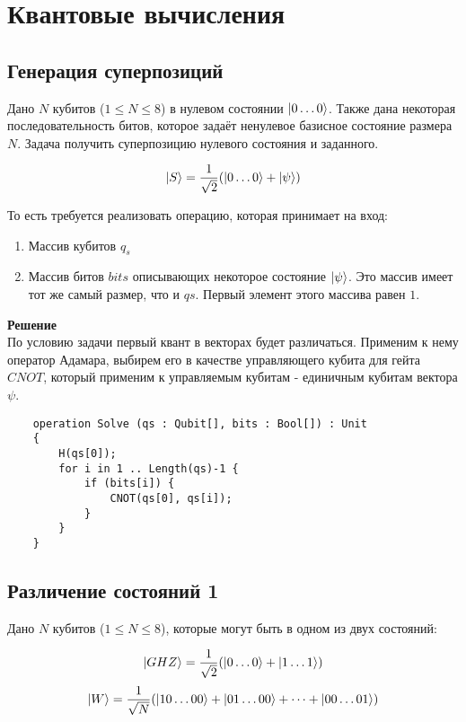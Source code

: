 \documentclass{article}
\begin{document}
\section{Квантовые вычисления}
\subsection{Генерация суперпозиций}
Дано $N$ кубитов ($1 \le N \le 8$) в нулевом состоянии $\ket{0\dots0}$. Также дана некоторая последовательность битов, которое задаёт ненулевое базисное состояние размера $N$. Задача получить суперпозицию нулевого состояния и заданного.

$$\ket{S} = \frac{1}{\sqrt2}(\ket{0\dots0} +\ket{\psi})$$

То есть требуется реализовать операцию, которая принимает на вход:

\begin{enumerate}
    \item Массив кубитов $q_s$
    \item Массив битов $bits$ описывающих некоторое состояние $\ket{\psi}$. Это массив имеет тот же самый размер, что и $qs$. Первый элемент этого массива равен $1$.
\end{enumerate}
\textbf{Решение}\\По условию задачи первый квант в векторах будет различаться. Применим к нему оператор Адамара, выбирем его в качестве управляющего кубита для гейта $CNOT$, который применим к управляемым кубитам - единичным кубитам вектора $\psi$.

\begin{verbatim}
    operation Solve (qs : Qubit[], bits : Bool[]) : Unit
    {
        H(qs[0]);
        for i in 1 .. Length(qs)-1 {
            if (bits[i]) {
                CNOT(qs[0], qs[i]);
            }
        }
    }
\end{verbatim}
\subsection{Различение состояний 1}
Дано $N$ кубитов ($1 \le N \le 8$), которые могут быть в одном из двух состояний:

$$\ket{GHZ} = \frac{1}{\sqrt2}(\ket{0\dots0} +\ket{1\dots1})$$
$$\ket{W} = \frac{1}{\sqrt N}(\ket{10\dots00}+\ket{01\dots00} + \dots +\ket{00\dots01})$$
\end{document}
